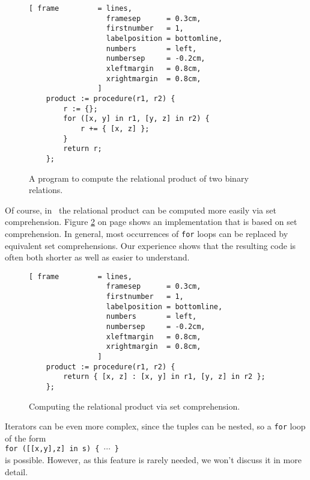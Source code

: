 \begin{figure}[!ht]
\centering
\begin{Verbatim}[ frame         = lines, 
                  framesep      = 0.3cm, 
                  firstnumber   = 1,
                  labelposition = bottomline,
                  numbers       = left,
                  numbersep     = -0.2cm,
                  xleftmargin   = 0.8cm,
                  xrightmargin  = 0.8cm,
                ]
    product := procedure(r1, r2) {
        r := {};
        for ([x, y] in r1, [y, z] in r2) {
            r += { [x, z] };
        }
        return r;
    };
\end{Verbatim}
\vspace*{-0.3cm}
\caption{A program to compute the relational product of two binary relations.}
\label{fig:relational-product-for-1.stlx}
\end{figure}

Of course, in \setlx\ the relational product can be computed more easily via set comprehension.
Figure \ref{fig:relational-product.stlx} on page \pageref{fig:relational-product.stlx} shows
an implementation that is based on set comprehension.  
In general, most occurrences of \texttt{for} loops can be replaced by equivalent set
comprehensions. Our experience shows that the resulting code is often both shorter as well as easier to
understand. 


\begin{figure}[!ht]
\centering
\begin{Verbatim}[ frame         = lines, 
                  framesep      = 0.3cm, 
                  firstnumber   = 1,
                  labelposition = bottomline,
                  numbers       = left,
                  numbersep     = -0.2cm,
                  xleftmargin   = 0.8cm,
                  xrightmargin  = 0.8cm,
                ]
    product := procedure(r1, r2) {
        return { [x, z] : [x, y] in r1, [y, z] in r2 };
    };
\end{Verbatim}
\vspace*{-0.3cm}
\caption{Computing the relational product via set comprehension.}
\label{fig:relational-product.stlx}
\end{figure}

Iterators can be even more complex, since the tuples can be nested, so a \texttt{for} loop of the form
\\[0.2cm]
\hspace*{1.3cm}
\texttt{for ([[x,y],z] in s) \{ $\cdots$ \}}
\\[0.2cm]
is possible.  However, as this feature is rarely needed, we won't discuss it in more detail.



